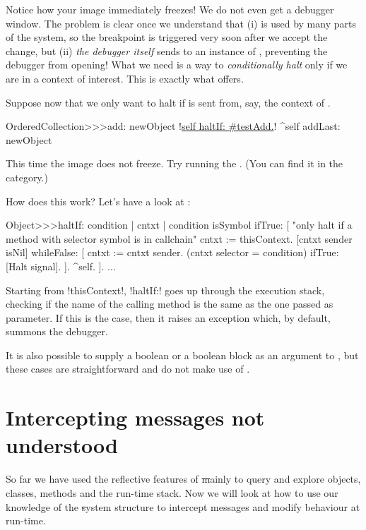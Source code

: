 \documentclass[a4paper,10pt,twoside]{book}
\begin{document}
Notice how your image immediately freezes!  We do not even get a debugger window.
The problem is clear once we understand that (i)  is used by many parts of the system, so the breakpoint is triggered very soon after we accept the change, but (ii) \emph{the debugger itself} sends  to an instance of , preventing the debugger from opening!
What we need is a way to \emph{conditionally halt} only if we are in a context of interest.
This is exactly what  offers.

Suppose now that we only want to halt if  is sent from, say, the context of .

\begin{code}{}
OrderedCollection>>>add: newObject
	!\underline{self haltIf: \#testAdd.}!
	^self addLast: newObject
\end{code}

This time the image does not freeze. Try running the .
(You can find it in the  category.)

How does this work?  Let's have a look at :
\begin{code}{}
Object>>>haltIf: condition
	| cntxt |
	condition isSymbol ifTrue: [
		"only halt if a method with selector symbol is in callchain"
		cntxt := thisContext.
		[cntxt sender isNil] whileFalse: [
			cntxt := cntxt sender. 
			(cntxt selector = condition) ifTrue: [Halt signal]. ].
		^self.
	].
	...
\end{code}

Starting from \ct!thisContext!, \ct!haltIf:! goes up through the execution stack, checking if the name of the calling method is the same as the one passed as parameter.
If this is the case, then it raises an exception which, by default, summons the debugger.

It is also possible to supply a boolean or a boolean block as an argument to , but these cases are straightforward and do not make use of .

\section{Intercepting messages not understood}

So far we have used the reflective features of \st mainly to query and explore objects, classes, methods and the run-time stack. Now we will look at how to use our knowledge of the \st system structure to intercept messages and modify behaviour at run-time.
\end{document}
